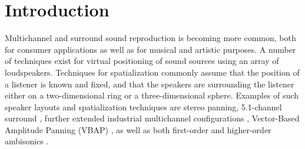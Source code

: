 \documentclass[twoside,10pt]{article}
\title{\papertitle}
\begin{document}
    
\maketitle




%
%




\begin{abstract}
Most common techniques for spatialization require the listener to be positioned at a ``sweet spot'' surrounded by loudspeakers. For practical concert, stage and installation applications such layouts may not be undesirable. Distance-Based Amplitude Panning (DBAP) offers an alternative panning-based spatialization method where no assumptions are made concerning the layout of the speaker array nor the position of the listener.  DBAP is implemented both as an external for Max/MSP and as a module for the Jamoma framework.
\end{abstract}








%
%


\section{Introduction}\label{sec:introduction}

Multichannel and surround sound reproduction is becoming more common, both for consumer applications as well as for musical and artistic purposes. A number of techniques exist for virtual positioning of sound sources using an array of loudspeakers.  Techniques for spatialization commonly assume that the position of a listener is known and fixed, and that the speakers are surrounding the listener either on a two-dimensional ring or a three-dimensional sphere. Examples of such speaker layouts and spatialization techniques are stereo panning, 5.1-channel surround \cite{ITU:1993_surround_5:1}, further extended industrial multichannel configurations \cite{Rumsey:2001spatial_audio}, Vector-Based Amplitude Panning (VBAP) \cite{Pulkki:1997vbap}, as well as both first-order and higher-order ambisonics \cite{Gerzon:1974surround, Poletti:2000holographic_sound}.
\end{document}
